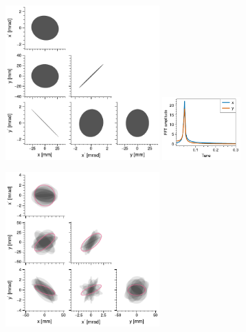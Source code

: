 \begin{figure}[!p]
    \centering
    \begin{subfigure}[t]{\textwidth}
        \includegraphics[width=0.65\textwidth, valign=t]{Images/chapter2/matched_env_SNS.pdf}
        \includegraphics[width=0.33\textwidth, valign=t]{Images/chapter2/matched_env_SNS_fft.pdf}
    \end{subfigure}
    \vfill
    \vspace*{0.6cm}
    \vfill
    \begin{subfigure}[b]{\textwidth}
        \includegraphics[width=0.65\textwidth, valign=t]{Images/chapter2/mismatched_env_SNS.pdf}

\end{subfigure}
\end{figure}
